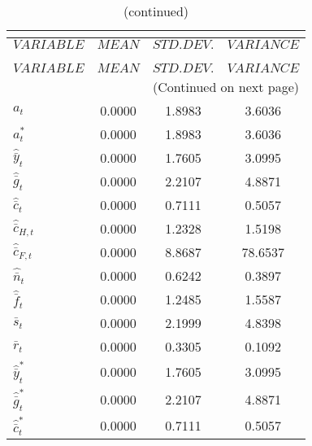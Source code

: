  
\begin{center}
\begin{longtable}{lccc} 
\caption{THEORETICAL MOMENTS}\\
 \label{Table:th_moments}\\
\toprule 
$VARIABLE                 $	 & 	 $         MEAN$	 & 	 $    STD. DEV.$	 & 	 $     VARIANCE$\\
\midrule \endfirsthead 
\caption{(continued)}\\
 \toprule \\ 
$VARIABLE                 $	 & 	 $         MEAN$	 & 	 $    STD. DEV.$	 & 	 $     VARIANCE$\\
\midrule \endhead 
\midrule \multicolumn{4}{r}{(Continued on next page)} \\ \bottomrule \endfoot 
\bottomrule \endlastfoot 
${a_t}                    $	 & 	       0.0000	 & 	       1.8983	 & 	       3.6036 \\ 
${a_t^*}                  $	 & 	       0.0000	 & 	       1.8983	 & 	       3.6036 \\ 
${\hat {\bar y}_t}        $	 & 	       0.0000	 & 	       1.7605	 & 	       3.0995 \\ 
${\hat {\bar g}_t}        $	 & 	       0.0000	 & 	       2.2107	 & 	       4.8871 \\ 
${\hat {\bar c}_t}        $	 & 	       0.0000	 & 	       0.7111	 & 	       0.5057 \\ 
${\hat {\bar c}_{H,t}}    $	 & 	       0.0000	 & 	       1.2328	 & 	       1.5198 \\ 
${\hat {\bar c}_{F,t}}    $	 & 	       0.0000	 & 	       8.8687	 & 	      78.6537 \\ 
${\hat {\bar n}_t}        $	 & 	       0.0000	 & 	       0.6242	 & 	       0.3897 \\ 
${\hat {\bar f}_t}        $	 & 	       0.0000	 & 	       1.2485	 & 	       1.5587 \\ 
${\bar s_t}               $	 & 	       0.0000	 & 	       2.1999	 & 	       4.8398 \\ 
${\bar r_t}               $	 & 	       0.0000	 & 	       0.3305	 & 	       0.1092 \\ 
${\hat {\bar y}_t^*}      $	 & 	       0.0000	 & 	       1.7605	 & 	       3.0995 \\ 
${\hat {\bar g}_t^*}      $	 & 	       0.0000	 & 	       2.2107	 & 	       4.8871 \\ 
${\hat {\bar c}_t^*}      $	 & 	       0.0000	 & 	       0.7111	 & 	       0.5057 \\ 

\end{longtable}
\end{center}
